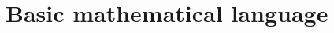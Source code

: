 \documentclass[12pt]{book}
\newcommand{\diff}{\text{d}}
\newcommand{\eqdef}{\textbf{:=}}
\begin{document}
\tableofcontents






\chapter{Basic mathematical language}
\end{document}

